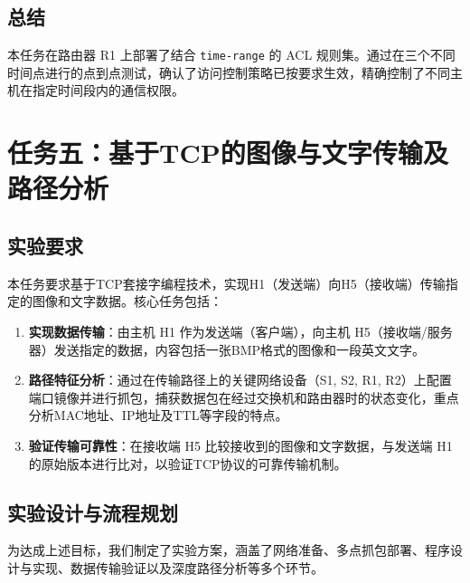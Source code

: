 \documentclass[12pt, a4paper]{article}
\begin{document}
\subsection{总结}

本任务在路由器 R1 上部署了结合 \texttt{time-range} 的 ACL 规则集。通过在三个不同时间点进行的点到点测试，确认了访问控制策略已按要求生效，精确控制了不同主机在指定时间段内的通信权限。

\newpage
\section{任务五：基于TCP的图像与文字传输及路径分析}

\subsection{实验要求}

本任务要求基于TCP套接字编程技术，实现H1（发送端）向H5（接收端）传输指定的图像和文字数据。核心任务包括：

\begin{enumerate}
    \item \textbf{实现数据传输}：由主机 H1 作为发送端（客户端），向主机 H5（接收端/服务器）发送指定的数据，内容包括一张BMP格式的图像和一段英文文字。
    \item \textbf{路径特征分析}：通过在传输路径上的关键网络设备（S1, S2, R1, R2）上配置端口镜像并进行抓包，捕获数据包在经过交换机和路由器时的状态变化，重点分析MAC地址、IP地址及TTL等字段的特点。
    \item \textbf{验证传输可靠性}：在接收端 H5 比较接收到的图像和文字数据，与发送端 H1 的原始版本进行比对，以验证TCP协议的可靠传输机制。
\end{enumerate}

\subsection{实验设计与流程规划}

为达成上述目标，我们制定了实验方案，涵盖了网络准备、多点抓包部署、程序设计与实现、数据传输验证以及深度路径分析等多个环节。
\end{document}
